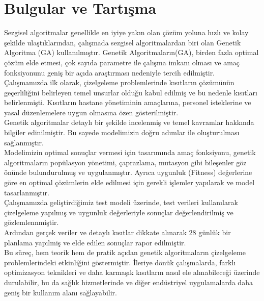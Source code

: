 \documentclass[12pt, a4paper]{article}
\begin{document}
\begin{flushleft}
\begin{center}
\begin{landscape}
\begin{table}
		\end{table}
		
		
	\end{landscape}
\end{center}







\section{Bulgular ve Tartışma }

Sezgisel algoritmalar 
genellikle en iyiye yakın olan çözüm yoluna hızlı ve kolay şekilde ulaştıklarından, çalışmada sezgisel algoritmalardan biri olan Genetik Algoritma (GA) kullanılmıştır. Genetik Algoritmaların(GA), birden fazla optimal çözüm elde etmesi, çok sayıda parametre ile çalışma imkanı olması ve amaç fonksiyonunu geniş bir açıda araştırması nedeniyle tercih edilmiştir.\\
Çalışmamızda ilk olarak, çizelgeleme problemlerinde kısıtların çözümünün geçerliliğini belirleyen temel unsurlar olduğu kabul edilmiş ve bu nedenle kısıtları belirlenmişti. Kısıtların hastane yönetiminin amaçlarına, personel isteklerine ve yasal düzenlemelere uygun olmasına özen gösterilmiştir.\\

Genetik algoritmalar detaylı bir şekilde incelenmiş ve temel kavramlar hakkında bilgiler edinilmiştir. Bu sayede modelimizin  doğru adımlar ile  oluşturulması sağlanmıştır.\\

Modelimizin optimal sonuçlar vermesi için tasarımında amaç fonksiyonu, genetik algoritmaların popülasyon yönetimi, çaprazlama, mutasyon gibi bileşenler göz önünde bulundurulmuş ve uygulanmıştır. Ayrıca uygunluk (Fitness) değerlerine göre en optimal çözümlerin elde edilmesi için gerekli işlemler yapılarak ve model tasarlanmıştır.\\

Çalışmamızda geliştirdiğimiz test modeli üzerinde, test verileri kullanılarak çizelgeleme yapılmış ve uygunluk değerleriyle sonuçlar değerlendirilmiş ve gözlemlennmiştir.\\

Ardından gerçek veriler ve detaylı kısıtlar dikkate alınarak 28 günlük bir planlama yapılmiş ve elde edilen sonuçlar rapor edilmiştir.\\

Bu süreç, hem teorik hem de pratik açıdan genetik algoritmaların çizelgeleme problemlerindeki etkinliğini göstermiştir. İleriye dönük çalışmalarda, farklı optimizasyon teknikleri ve daha karmaşık kısıtların nasıl ele alınabileceği üzerinde durulabilir, bu da sağlık hizmetlerinde ve diğer endüstriyel uygulamalarda daha geniş bir kullanım alanı sağlayabilir.\\


\end{flushleft}
\end{document}

